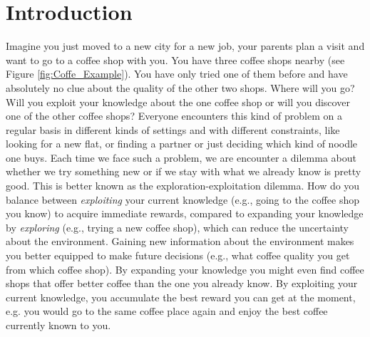 %
\chapter{Introduction}
Imagine you just moved to a new city for a new job, your parents plan a visit and want to go to a coffee shop with you. You have three coffee shops nearby (see Figure \ref{fig:Coffe_Example}). You have only tried one of them before and have absolutely no clue about the quality of the other two shops. Where will you go? Will you exploit your knowledge about the one coffee shop or will you discover one of the other coffee shops?
Everyone encounters this kind of problem on a regular basis in different kinds of settings and with different constraints, like looking for a new flat, or finding a partner or just deciding which kind of noodle one buys. 
Each time we face such a problem, we are encounter a dilemma about whether we try something new or if we stay with what we already know is pretty good. 
This is better known as the exploration-exploitation dilemma. How do you balance between \textit{exploiting} your current knowledge (e.g., going to the coffee shop you know) to acquire immediate rewards, compared to expanding your knowledge by \textit{exploring} (e.g., trying a new coffee shop), which can reduce the uncertainty about the environment.
Gaining new information about the environment makes you better equipped to make future decisions (e.g., what coffee quality you get from which coffee shop). By expanding your knowledge you might even find coffee shops that offer better coffee than the one you already know. By exploiting your current knowledge, you accumulate the best reward you can get at the moment, e.g. you would go to the same coffee place again and enjoy the best coffee currently known to you. 



